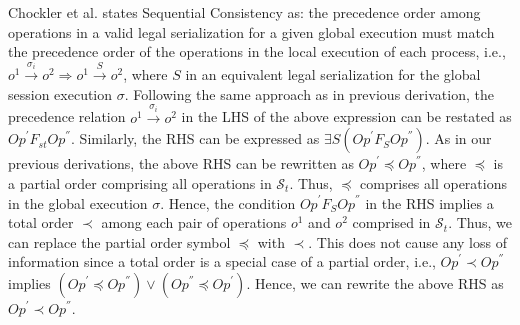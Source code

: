 \documentclass[journal,compsoc]{IEEEtran}
\begin{document}
   \par Chockler et al. states Sequential Consistency as: the precedence order among operations  in a valid legal serialization for a given global execution must match the precedence order of the operations in the local execution of each process, i.e.,  $\mathit{o}^1 \xrightarrow{\sigma_i} \mathit{o}^2 \Rightarrow \mathit{o}^1 \xrightarrow{S} \mathit{o}^2$, where $S$ in an equivalent legal serialization for the global session execution $\sigma$.  Following the same approach as in previous derivation, %
  the precedence relation $\mathit{o}^1 \xrightarrow{\sigma_i} \mathit{o}^2$ in the LHS of the above expression can be restated as
   $\mathit{Op}^{'} F_\mathit{st}  \mathit{Op}^{''}$.  %
   Similarly, the RHS can be expressed as $ \exists S \left( \mathit{Op}^{'} F_{S} \mathit{Op}^{''} \right)$. %
  As in our previous derivations, the above RHS can be rewritten as ${\mathit{Op}}^{'}  \preccurlyeq {\mathit{Op}}^{''}$, where $ \preccurlyeq$ is a partial order comprising all operations in $\mathcal{S}_t$. Thus, $ \preccurlyeq$ comprises all operations in the global execution $\sigma$. Hence, the condition ${\mathit{Op}}^{'}  F_{S} {\mathit{Op}}^{''} $ in the RHS implies a total order $\prec$ among each pair of operations $\mathit{o}^1 $ and $\mathit{o}^2$ comprised in $\mathcal{S}_t$. Thus, we can replace the partial order symbol $\preccurlyeq$ with $\prec$. This does not cause any loss of information since a total order is a special case of a partial order, i.e., ${\mathit{Op}}^{'}  \prec {\mathit{Op}}^{''}$  implies $\left( {\mathit{Op}}^{'} \preccurlyeq {\mathit{Op}}^{''} \right) \vee \left( {\mathit{Op}}^{''}  \preccurlyeq {\mathit{Op}}^{'}\right)$. Hence, we can rewrite the above RHS as  ${\mathit{Op}}^{'}  \prec {\mathit{Op}}^{''} $. 
\end{document}
